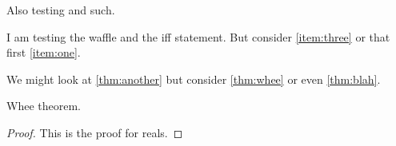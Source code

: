 \documentclass{ximera}
\begin{document}
\begin{problem}
  Also testing  and such.
\end{problem}


I am testing the waffle and the iff statement.  But consider \ref{item:three} or that first \ref{item:one}.


\begin{theorem}
  \label{thm:blah}
\end{theorem}

We might look at \ref{thm:another} but consider \ref{thm:whee} or even \ref{thm:blah}.

\begin{theorem}
  \label{thm:whee}  Whee theorem.
\end{theorem}
\begin{proof}
This is the proof for reals.
\end{proof}
\end{document}
